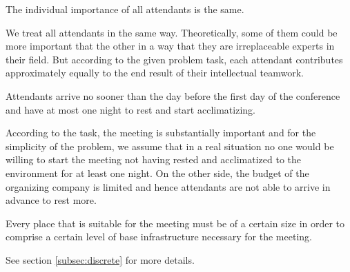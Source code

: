 \begin{assumption}
The individual importance of all attendants is the same.
\end{assumption}

We treat all attendants in the same way. Theoretically, some of them could be more important that the other in a way that they are irreplaceable experts in their field. But according to the given problem task, each attendant contributes approximately equally to the end result of their intellectual teamwork.

\begin{assumption}
Attendants arrive no sooner than the day before the first day of the conference and have at most one night to rest and start acclimatizing.
\end{assumption}

According to the task, the meeting is substantially important and for the simplicity of the problem, we assume that in a real situation no one would be willing to start the meeting not having rested and acclimatized to the environment for at least one night. On the other side, the budget of the organizing company is limited and hence attendants are not able to arrive in advance to rest more.

\begin{assumption}
Every place that is suitable for the meeting must be of a certain size in order to comprise a certain level of base infrastructure necessary for the meeting.
\end{assumption}

See section \ref{subsec:discrete} for more details.

